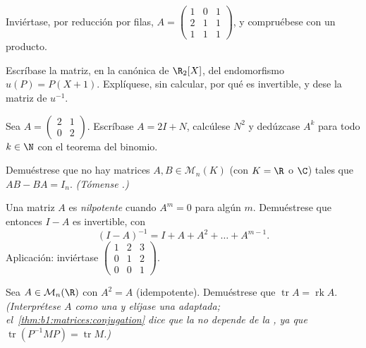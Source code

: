 \begin{exercise}[$\star$]\label{exo:b1:matrices:3}
Inviértase, por reducción por filas, $A = \begin{pmatrix} 1 & 0 & 1\\
2 & 1 & 1\\ 1 & 1 & 1 \end{pmatrix}$, y compruébese con un producto.
\end{exercise}

\begin{exercise}[$\star$]\label{exo:b1:matrices:4}
Escríbase la matriz, en la  canónica de $\R_2[X]$, del
endomorfismo $u(P) = P(X + 1)$. Explíquese, sin calcular, por qué es
invertible, y dese la matriz de $u^{-1}$.
\end{exercise}

\begin{exercise}[$\star\star$]\label{exo:b1:matrices:5}
Sea $A = \begin{pmatrix} 2 & 1 \\ 0 & 2\end{pmatrix}$. Escríbase
$A = 2I + N$, calcúlese $N^2$ y dedúzcase $A^k$ para todo $k \in \N$
con el teorema del binomio.
\end{exercise}

\begin{exercise}[$\star\star$]\label{exo:b1:matrices:6}
Demuéstrese que no hay matrices $A, B \in \mathcal{M}_n(K)$ (con
$K = \R$ o $\C$) tales que $AB - BA = I_n$. \emph{(Tómense .)}
\end{exercise}

\begin{exercise}[$\star\star$]\label{exo:b1:matrices:7}
Una matriz $A$ es \emph{nilpotente} cuando $A^m = 0$ para algún $m$.
Demuéstrese que entonces $I - A$ es invertible, con
\[
(I - A)^{-1} = I + A + A^2 + \dots + A^{m-1} .
\]
Aplicación: inviértase $\begin{pmatrix} 1 & 2 & 3\\ 0 & 1 & 2\\ 0 & 0
& 1\end{pmatrix}$.
\end{exercise}

\begin{exercise}[$\star\star$]\label{exo:b1:matrices:8}
Sea $A \in \mathcal{M}_n(\R)$ con $A^2 = A$ (idempotente).
Demuéstrese que $\operatorname{tr} A = \operatorname{rk} A$.
\emph{(Interprétese $A$ como una  y elíjase una 
adaptada; el~\cref{thm:b1:matrices:conjugation} dice que la  no
depende de la , ya que $\operatorname{tr}(P^{-1}MP) =
\operatorname{tr} M$.)}
\end{exercise}

